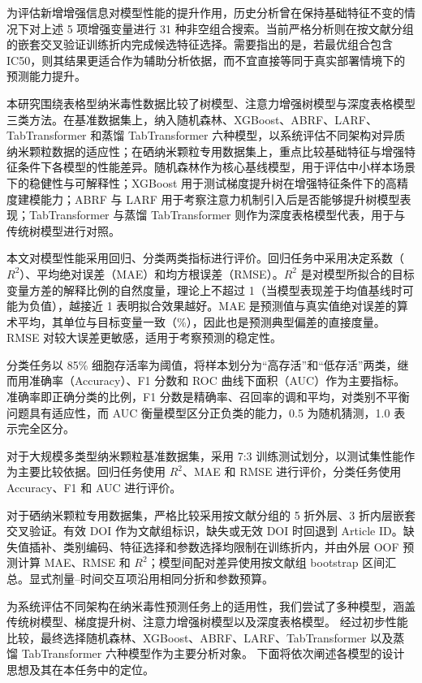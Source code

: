 为评估新增增强信息对模型性能的提升作用，历史分析曾在保持基础特征不变的情况下对上述 5 项增强变量进行 31 种非空组合搜索。当前严格分析则在按文献分组的嵌套交叉验证训练折内完成候选特征选择。需要指出的是，若最优组合包含 IC50，则其结果更适合作为辅助分析依据，而不宜直接等同于真实部署情境下的预测能力提升。

本研究围绕表格型纳米毒性数据比较了树模型、注意力增强树模型与深度表格模型三类方法。在基准数据集上，纳入随机森林、XGBoost、ABRF、LARF、TabTransformer 和蒸馏 TabTransformer 六种模型，以系统评估不同架构对异质纳米颗粒数据的适应性；在硒纳米颗粒专用数据集上，重点比较基础特征与增强特征条件下各模型的性能差异。随机森林作为核心基线模型，用于评估中小样本场景下的稳健性与可解释性；XGBoost 用于测试梯度提升树在增强特征条件下的高精度建模能力；ABRF 与 LARF 用于考察注意力机制引入后是否能够提升树模型表现；TabTransformer 与蒸馏 TabTransformer 则作为深度表格模型代表，用于与传统树模型进行对照。

本文对模型性能采用回归、分类两类指标进行评价。回归任务中采用决定系数（\(R^2\)）、平均绝对误差（MAE）和均方根误差（RMSE）。\(R^2\) 是对模型所拟合的目标变量方差的解释比例的自然度量，理论上不超过 1（当模型表现差于均值基线时可能为负值），越接近 1 表明拟合效果越好。MAE 是预测值与真实值绝对误差的算术平均，其单位与目标变量一致（\%），因此也是预测典型偏差的直接度量。RMSE 对较大误差更敏感，适用于考察预测的稳定性。

分类任务以 85\% 细胞存活率为阈值，将样本划分为“高存活”和“低存活”两类，继而用准确率（Accuracy）、F1 分数和 ROC 曲线下面积（AUC）作为主要指标。准确率即正确分类的比例，F1 分数是精确率、召回率的调和平均，对类别不平衡问题具有适应性，而 AUC 衡量模型区分正负类的能力，0.5 为随机猜测，1.0 表示完全区分。

对于大规模多类型纳米颗粒基准数据集，采用 7:3 训练测试划分，以测试集性能作为主要比较依据。回归任务使用 $R^2$、MAE 和 RMSE 进行评价，分类任务使用 Accuracy、F1 和 AUC 进行评价。

对于硒纳米颗粒专用数据集，严格比较采用按文献分组的 5 折外层、3 折内层嵌套交叉验证。有效 DOI 作为文献组标识，缺失或无效 DOI 时回退到 Article ID。缺失值插补、类别编码、特征选择和参数选择均限制在训练折内，并由外层 OOF 预测计算 MAE、RMSE 和 $R^2$；模型间配对差异使用按文献组 bootstrap 区间汇总。显式剂量--时间交互项沿用相同分折和参数预算。

为系统评估不同架构在纳米毒性预测任务上的适用性，我们尝试了多种模型，涵盖传统树模型、梯度提升树、注意力增强树模型以及深度表格模型。
经过初步性能比较，最终选择随机森林、XGBoost、ABRF、LARF、TabTransformer 以及蒸馏 TabTransformer 六种模型作为主要分析对象。
下面将依次阐述各模型的设计思想及其在本任务中的定位。

